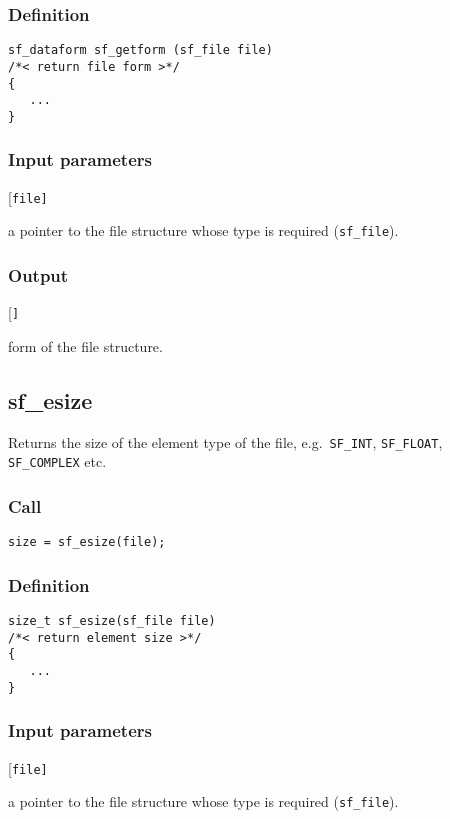 \subsubsection*{Definition}
\begin{verbatim}
sf_dataform sf_getform (sf_file file)
/*< return file form >*/
{
   ...
}
\end{verbatim}

\subsubsection*{Input parameters}
\begin{desclist}{\tt }{\quad}[\tt file]
   \setlength\itemsep{0pt}
   \item[file] a pointer to the file structure whose type is required (\texttt{sf\_file}).  
\end{desclist}

\subsubsection*{Output}
\begin{desclist}{\tt }{\quad}[\tt ]
   \setlength\itemsep{0pt}
   \item[file->form] form of the file structure.
\end{desclist}




\subsection{{sf\_esize}}
Returns the size of the element type of the file, e.g.~\texttt{SF\_INT}, \texttt{SF\_FLOAT}, \texttt{SF\_COMPLEX} etc.

\subsubsection*{Call}
\begin{verbatim}size = sf_esize(file);\end{verbatim}

\subsubsection*{Definition}
\begin{verbatim}
size_t sf_esize(sf_file file)
/*< return element size >*/
{
   ...
}
\end{verbatim}

\subsubsection*{Input parameters}
\begin{desclist}{\tt }{\quad}[\tt file]
   \setlength\itemsep{0pt}
   \item[file] a pointer to the file structure whose type is required (\texttt{sf\_file}).  
\end{desclist}

